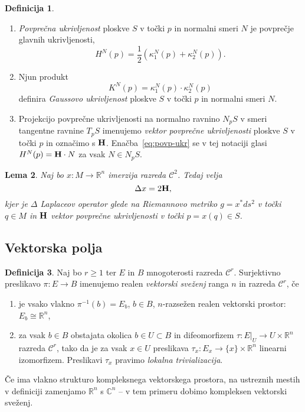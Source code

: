 \documentclass[12pt,a4paper,twoside]{article}
\theoremstyle{definition} %
\newtheorem{definicija}{Definicija}[section]
\theoremstyle{plain} %
\newtheorem{lema}[definicija]{Lema}
\numberwithin{equation}{section}  %
\newcommand{\R}{\mathbb R}
\newcommand{\C}{\mathbb C}
\begin{document}
\begin{definicija}
\begin{enumerate}
\item
\emph{Povprečna ukrivljenost} ploskve $S$ v točki $p$ in normalni smeri $N$ je povprečje glavnih ukrivljenosti,
\begin{equation} \label{eq:povp-ukr}
H^{N}(p) = \frac{1}{2} \left(\kappa _{1}^{N}(p) + \kappa _{2}^{N}(p) \right).
\end{equation}
\item
Njun produkt 
\begin{equation} \label{eq:Gauss-ukr}
K^{N}(p) = \kappa _{1}^{N}(p) \cdot \kappa _{2}^{N}(p)
\end{equation}
definira \emph{Gaussovo ukrivljenost} ploskve $S$ v točki $p$ in normalni smeri $N$.
\item
Projekcijo povprečne ukrivljenosti na normalno ravnino $N_{p}S$ v smeri tangentne ravnine $T_{p}S$ imenujemo \emph{vektor povprečne ukrivljenosti} ploskve $S$ v točki $p$ in označimo s $\textbf{\textup{H}}$. Enačba~\ref{eq:povp-ukr} se v tej notaciji glasi $H^{N}(p) = \textbf{\textup{H}} \cdot N$ za vsak $N \in N_{p}S$.
\end{enumerate}
\end{definicija}

\begin{lema}
Naj bo $x \colon M \to \R^{n}$ imerzija razreda $\mathcal{C}^2$. Tedaj velja
\begin{equation}
\Delta{x} = 2 \textbf{\textup{H}},
\end{equation}
kjer je $\Delta$ Laplaceov operator glede na Riemannovo metriko $g = x^{*}ds^2$ v točki $q \in M$ in $\textbf{\textup{H}}$ vektor povprečne ukrivljenosti v točki $p = x(q) \in S$.
\end{lema}

\subsection{Vektorska polja}
%
\begin{definicija}
Naj bo $r \geq 1$ ter $E$ in $B$ mnogoterosti razreda $\mathcal{C}^{r}$.
Surjektivno preslikavo $\pi \colon E \to B$ imenujemo realen \emph{vektorski sveženj} ranga $n$ in razreda $\mathcal{C}^{r}$, če
\begin{enumerate}
\item je vsako vlakno $\pi^{-1}(b) = E_{b}$, $b \in B$, $n$-razsežen realen vektorski prostor: $E_{b} \cong \R^{n}$,
\item za vsak $b \in B$ obstajata okolica $b \in U \subset B$ in difeomorfizem $\tau \colon E|_{U} \to U \times \R^{n}$ razreda $\mathcal{C}^{r}$, tako da je za vsak $x \in U$ preslikava $ \tau_{x} \colon E_{x} \to \{x\} \times \R^{n} $ linearni izomorfizem. Preslikavi $\tau_{x}$ pravimo \emph{lokalna trivializacija}.
\end{enumerate}
Če ima vlakno strukturo kompleksnega vektorskega prostora, na ustreznih mestih v definiciji zamenjamo $\R^{n}$ s $\C^{n}$ -- v tem primeru dobimo kompleksen vektorski sveženj.
\end{definicija}
\end{document}
